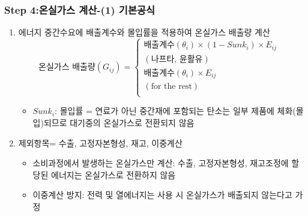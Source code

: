 \documentclass[10pt,compress,slidetop,%
			   hyperref={unicode},xcolor={svgnames},%
			   t]{beamer}
\begin{document}
\begin{frame}
	\frametitle{Step 4:온실가스 계산-(1) 기본공식}
\bigskip
\begin{enumerate}
\item{에너지 중간수요에 배출계수와 몰입률을 적용하여 온실가스 배출량 계산} 
\smallskip
\begin{displaymath}
			\mbox{온실가스 배출량} (G_{ij})=\left\{\begin{array}{lr}
\mbox{배출계수}(\theta_i)\times (1-Sunk_i)\times E_{ij}&\\
(\mbox{나프타, 윤활유})& \\
\mbox{배출계수}(\theta_i)\times E_{ij}&\\
(\mbox{for the rest})&\\
\end{array}\right.
\end{displaymath}
\begin{itemize}
\item{$Sunk_i$: 몰입률 = 연료가 아닌 중간재에 포함되는 탄소는 일부 제품에 체화(몰입)되므로 대기중의 온실가스로 전환되지 않음}
\end{itemize}
\bigskip
\item{제외항목= 수출, 고정자본형성, 재고, 이중계산}
\begin{itemize}
\item{소비과정에서 발생하는 온실가스만 계산: 수출, 고정자본형성, 재고조정에 할당된 에너지는 온실가스로 전환하지 않음}
\item{이중계산 방지: 전력 및 열에너지는 사용 시 온실가스가 배출되지 않는다고 가정}
\end{itemize}
\end{enumerate}
\end{frame}
\end{document}
